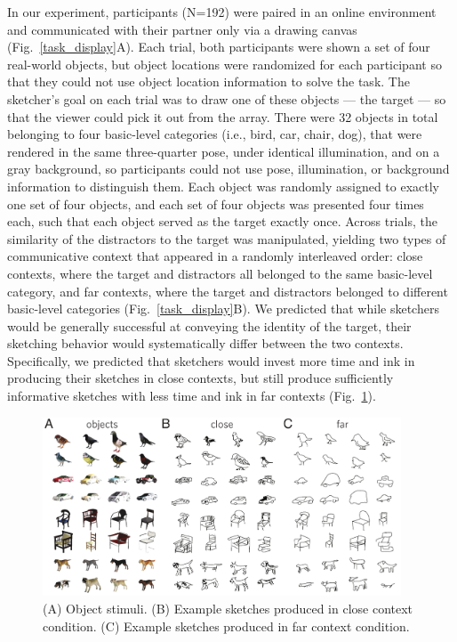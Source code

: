 \documentclass{svjour3}
\begin{document}

In our experiment, participants (N=192) were paired in an online environment and communicated with their partner only via a drawing canvas (Fig.~\ref{task_display}A). 
Each trial, both participants were shown a set of four real-world objects, but object locations were randomized for each participant so that they could not use object location information to solve the task. 
The sketcher's goal on each trial was to draw one of these objects --- the target --- so that the viewer could pick it out from the array. 
There were 32 objects in total belonging to four basic-level categories (i.e., bird, car, chair, dog), that were rendered in the same three-quarter pose, under identical illumination, and on a gray background, so participants could not use pose, illumination, or background information to distinguish them. 
Each object was randomly assigned to exactly one set of four objects, and each set of four objects was presented four times each, such that each object served as the target exactly once. 
Across trials, the similarity of the distractors to the target was manipulated, yielding two types of communicative context that appeared in a randomly interleaved order: close contexts, where the target and distractors all belonged to the same basic-level category, and far contexts, where the target and distractors belonged to different basic-level categories (Fig.~\ref{task_display}B). 
We predicted that while sketchers would be generally successful at conveying the identity of the target, their sketching behavior would systematically differ between the two contexts. 
Specifically, we predicted that sketchers would invest more time and ink in producing their sketches in close contexts, but still produce sufficiently informative sketches with less time and ink in far contexts (Fig.~\ref{sketch_gallery}). 

\begin{figure}[htbp]
\centering
\includegraphics[width=0.95\textwidth]{2_sketch_gallery-min.pdf}
\caption{(A) Object stimuli. (B) Example sketches produced in close context condition. (C) Example sketches produced in far context condition.}
\label{sketch_gallery}
\end{figure}
\end{document}
